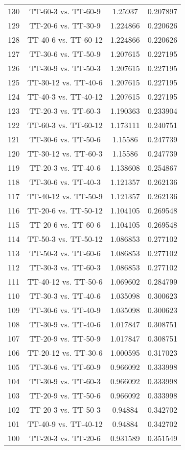 \documentclass[a4paper,10pt]{article}
\begin{document}
\begin{landscape}
\begin{table}[!htp]
\begin{tabular}{cccc}
130&TT-60-3 vs. TT-60-9&1.25937&0.207897\\
129&TT-20-6 vs. TT-30-9&1.224866&0.220626\\
128&TT-40-6 vs. TT-60-12&1.224866&0.220626\\
127&TT-30-6 vs. TT-50-9&1.207615&0.227195\\
126&TT-30-9 vs. TT-50-3&1.207615&0.227195\\
125&TT-30-12 vs. TT-40-6&1.207615&0.227195\\
124&TT-40-3 vs. TT-40-12&1.207615&0.227195\\
123&TT-20-3 vs. TT-60-3&1.190363&0.233904\\
122&TT-60-3 vs. TT-60-12&1.173111&0.240751\\
121&TT-30-6 vs. TT-50-6&1.15586&0.247739\\
120&TT-30-12 vs. TT-60-3&1.15586&0.247739\\
119&TT-20-3 vs. TT-40-6&1.138608&0.254867\\
118&TT-30-6 vs. TT-40-3&1.121357&0.262136\\
117&TT-40-12 vs. TT-50-9&1.121357&0.262136\\
116&TT-20-6 vs. TT-50-12&1.104105&0.269548\\
115&TT-20-6 vs. TT-60-6&1.104105&0.269548\\
114&TT-50-3 vs. TT-50-12&1.086853&0.277102\\
113&TT-50-3 vs. TT-60-6&1.086853&0.277102\\
112&TT-30-3 vs. TT-60-3&1.086853&0.277102\\
111&TT-40-12 vs. TT-50-6&1.069602&0.284799\\
110&TT-30-3 vs. TT-40-6&1.035098&0.300623\\
109&TT-30-6 vs. TT-40-9&1.035098&0.300623\\
108&TT-30-9 vs. TT-40-6&1.017847&0.308751\\
107&TT-20-9 vs. TT-50-9&1.017847&0.308751\\
106&TT-20-12 vs. TT-30-6&1.000595&0.317023\\
105&TT-30-6 vs. TT-60-9&0.966092&0.333998\\
104&TT-30-9 vs. TT-60-3&0.966092&0.333998\\
103&TT-20-9 vs. TT-50-6&0.966092&0.333998\\
102&TT-20-3 vs. TT-50-3&0.94884&0.342702\\
101&TT-40-9 vs. TT-40-12&0.94884&0.342702\\
100&TT-20-3 vs. TT-20-6&0.931589&0.351549\\

\end{tabular}
\end{table}
\end{landscape}
\end{document}
